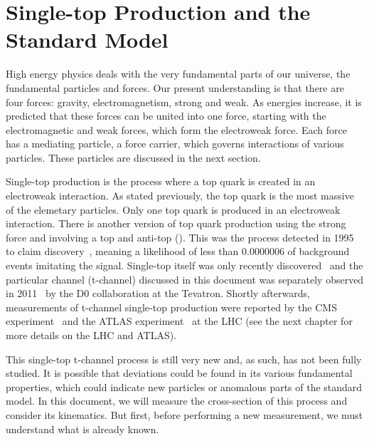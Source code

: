 \chapter{Single-top Production and the Standard Model}

High energy physics deals with the very fundamental parts of our universe, the fundamental particles and forces.  Our present understanding is that there are four forces: gravity, electromagnetism, strong and weak.  As energies increase, it is predicted that these forces can be united into one force, starting with the electromagnetic and weak forces, which form the electroweak force.  Each force has a mediating particle, a force carrier, which governs interactions of various particles.  These particles are discussed in the next section.

Single-top production is the process where a top quark is created in an electroweak interaction.  As stated previously, the top quark is the most massive of the elemetary particles.  Only one top quark is produced in an electroweak interaction.  There is another version of top quark production using the strong force and involving a top and anti-top (\ttbar).  This was the process detected in 1995 to claim discovery~\cite{ttbardiscovery1, ttbardiscovery2}, meaning a likelihood of less than 0.0000006 of background events imitating the signal.  Single-top itself was only recently discovered~\cite{singletopdiscovery:group, singletopdiscovery:D0, singletopdiscovery:CDF} and the particular channel (t-channel) discussed in this document was separately observed in 2011~\cite{tchanneldiscovery} by the D0 collaboration at the Tevatron.  Shortly afterwards, measurements of t-channel single-top production were reported by the CMS experiment~\cite{CMStchannel} and the ATLAS experiment~\cite{ATLAS-CONF-2011-088,ATLAS-CONF-2011-101} at the LHC (see the next chapter for more details on the LHC and ATLAS).  

This single-top t-channel process is still very new and, as such, has not been fully studied.  It is possible that deviations could be found in its various fundamental properties, which could indicate new particles or anomalous parts of the standard model.  In this document, we will measure the cross-section of this process and consider its kinematics.  But first, before performing a new measurement, we must understand what is already known.

